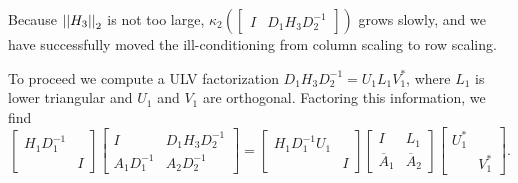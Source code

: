 %
Because $\left| \left| H_{3} \right| \right|_{2}$ is not too large,
$\kappa_{2}(\begin{bmatrix} I  & D_{1}H_{3}D_{2}^{-1} \end{bmatrix})$
grows slowly, and we have successfully moved
the ill-conditioning from column scaling to row scaling.

To proceed we compute a ULV factorization
$D_{1}H_{3}D_{2}^{-1} = U_{1}L_{1}V_{1}^{*}$,
where $L_{1}$ is lower triangular and $U_{1}$ and $V_{1}$ are
orthogonal.
Factoring this information, we find
%
\begin{equation}
    \begin{bmatrix}H_{1}D_{1}^{-1} & \\ & I \end{bmatrix}
        \begin{bmatrix} I  & D_{1}H_{3}D_{2}^{-1} \\
            A_{1}D_{1}^{-1} & A_{2}D_{2}^{-1} \end{bmatrix}
    = \begin{bmatrix}H_{1}D_{1}^{-1}U_{1} & \\ & I \end{bmatrix}
        \begin{bmatrix} I  & L_{1} \\
        \overline{A}_{1} & \overline{A}_{2} \end{bmatrix}
        \begin{bmatrix} U_{1}^{*} & \\ & V_{1}^{*} \end{bmatrix}.
\end{equation}

